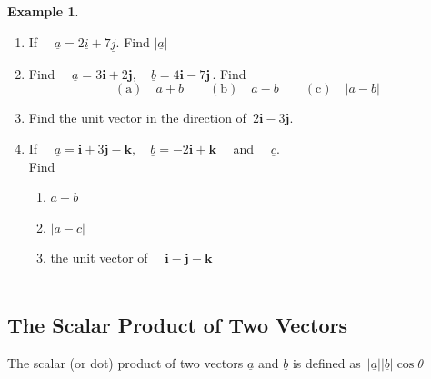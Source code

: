 \documentclass[11pt,a4paper]{article}
\theoremstyle{definition}
\newtheorem{example}[thm]{Example}
\begin{document}
\begin{example}

\begin{enumerate}
\item If $\quad  \underline{a} = 2\underline{i} + 7\underline{j}$. Find $\left|\underline{a}\right|$\\


\item Find $\quad  \underline{a} = 3\textbf{i} + 2\textbf{j}, \quad  \underline{b} = 4\textbf{i} - 7\textbf{j}\,$. Find 
$$(\text{a})\quad  \underline{a} + \underline{b} \qquad  (\text{b})\quad  \underline{a} - \underline{b} \qquad  (\text{c})\quad  \left|\underline{a} - \underline{b}\right|$$


\item Find the unit vector in the direction of $\, 2\textbf{i} - 3\textbf{j}$.

\item If $\quad  \underline{a} = \textbf{i} + 3\textbf{j} - \textbf{k}, \quad  \underline{b} = -2\textbf{i} + \textbf{k}\quad $ and $\quad  \underline{c}$.\\
Find
\begin{enumerate}
       \item $\underline{a} + \underline{b}$
       
       \item $\left|\underline{a} - \underline{c}\right|$
       
       \item the unit vector of $\quad \textbf{i} - \textbf{j} - \textbf{k}$\\\\
\end{enumerate}
\end{enumerate}
\end{example}
\subsection{The Scalar Product of Two Vectors}

The scalar (or dot) product of two vectors $\underline{a}$ and $\underline{b}$ is defined as $\,\left|\underline{a}\right| \left|\underline{b}\right|\cos \theta$


\end{document}
